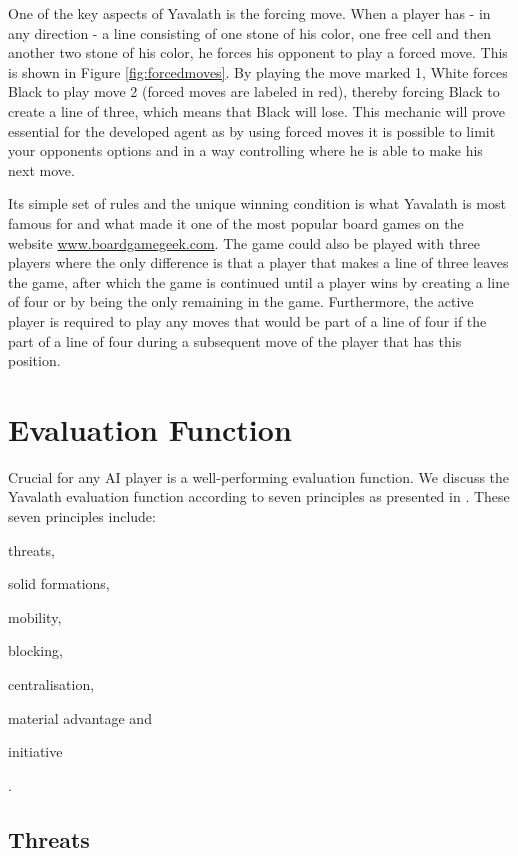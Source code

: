 \documentclass[11pt]{article}
\begin{document}


One of the key aspects of Yavalath is the forcing move. When a player has - in any direction - a line consisting of one stone of his color, one free cell and then another two stone of his color, he forces his opponent to play a forced move. This is shown in Figure \ref{fig:forcedmoves}. By playing the move marked 1, White forces Black to play move 2 (forced moves are labeled in red), thereby forcing Black to create a line of three, which means that Black will lose. This mechanic will prove essential for the developed agent as by using forced moves it is possible to limit your opponents options and in a way controlling where he is able to make his next move.



Its simple set of rules and the unique winning condition is what Yavalath is most famous for and what made it one of the most popular board games on the website \url{www.boardgamegeek.com}. The game could also be played with three players where the only difference is that a player that makes a line of three leaves the game, after which the game is continued until a player wins by creating a line of four or by being the only remaining in the game. Furthermore, the active player is required to play any moves that would be part of a line of four if the part of a line of four during a subsequent move of the player that has this position.

\section{Evaluation Function}
\label{-sec:evaluationfunction}

Crucial for any AI player is a well-performing evaluation function. We discuss the Yavalath evaluation function according to seven principles as presented in \cite{Winands2004}. These seven principles include: \begin{enumerate*}\item threats, \item solid formations, \item mobility, \item blocking, \item centralisation, \item material advantage and \item initiative\end{enumerate*}.

\subsection{Threats}
\label{-subsec:threats}
\end{document}
